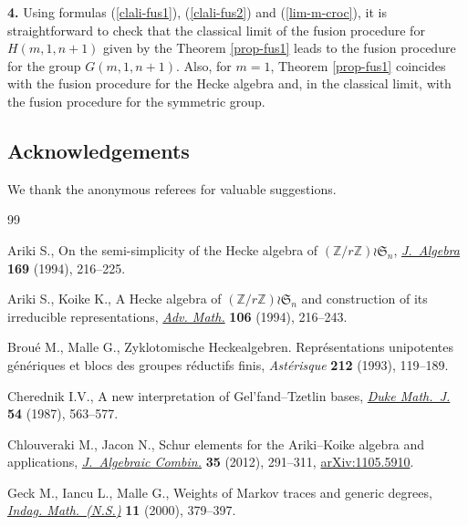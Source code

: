 \documentclass[pdftex]{sigma}
\begin{document}
{\bf 4.} Using formulas (\ref{clali-fus1}), (\ref{clali-fus2}) and (\ref{lim-m-croc}), it is straightforward to check that the classical limit of the fusion procedure for $H(m,1,n+1)$ given by the Theorem \ref{prop-fus1} leads to the fusion procedure \cite{OPdA} for the group $G(m,1,n+1)$. Also, for $m=1$,
Theorem \ref{prop-fus1} coincides with the fusion procedure \cite{IMO} for the Hecke algebra and, in the classical limit, with the fusion procedure \cite{Mo} for the symmetric group.

\subsection*{Acknowledgements}
We thank the anonymous referees for valuable suggestions.

\begin{thebibliography}{99}
\footnotesize\itemsep=0pt

Ariki S., On the semi-simplicity of the {H}ecke algebra of
  $(\mathbb{Z}/r\mathbb{Z})\wr {\mathfrak S}_n$, \href{http://dx.doi.org/10.1006/jabr.1994.1280}{\textit{J.~Algebra}}
  \textbf{169} (1994), 216--225.

Ariki S., Koike K., A {H}ecke algebra of $(\mathbb{Z}/r\mathbb{Z})\wr
  {\mathfrak S}_n$ and construction of its irreducible representations,
  \href{http://dx.doi.org/10.1006/aima.1994.1057}{\textit{Adv. Math.}} \textbf{106} (1994), 216--243.

Brou{\'e} M., Malle G., Zyklotomische {H}eckealgebren. Repr{\'e}sentations
  unipotentes g{\'e}n{\'e}riques et blocs des groupes r{\'e}ductifs f\/inis,
  \textit{Ast\'erisque} \textbf{212} (1993), 119--189.

Cherednik I.V., A new interpretation of {G}el'fand--{T}zetlin bases,
  \href{http://dx.doi.org/10.1215/S0012-7094-87-05423-8}{\textit{Duke Math.~J.}} \textbf{54} (1987), 563--577.

Chlouveraki M., Jacon N., Schur elements for the {A}riki--{K}oike algebra and
  applications, \href{http://dx.doi.org/10.1007/s10801-011-0314-4}{\textit{J.~Algebraic Combin.}} \textbf{35} (2012), 291--311,
  \href{http://arxiv.org/abs/1105.5910}{arXiv:1105.5910}.

Geck M., Iancu L., Malle G., Weights of {M}arkov traces and generic degrees,
  \href{http://dx.doi.org/10.1016/S0019-3577(00)80005-1}{\textit{Indag. Math.~(N.S.)}} \textbf{11} (2000), 379--397.


\end{thebibliography}
\end{document}
